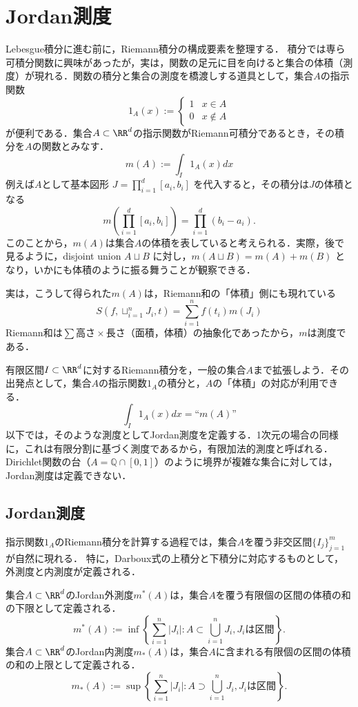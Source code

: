 \setcounter{chapter}{1}
\chapter{Jordan測度}

Lebesgue積分に進む前に，Riemann積分の構成要素を整理する．
積分では専ら可積分関数に興味があったが，実は，関数の足元に目を向けると集合の体積（測度）が現れる．関数の積分と集合の測度を橋渡しする道具として，集合$A$の指示関数
\[
1_A(x) := \begin{cases}
    1 & x \in A \\
    0 & x \notin A
\end{cases}
\]
が便利である．集合$A \subset \RR^d$の指示関数がRiemann可積分であるとき，その積分を$A$の関数とみなす．
\[
m(A) := \int_I 1_A(x) dx
\]
例えば$A$として基本図形 $J = \prod_{i=1}^d [a_i,b_i]$ を代入すると，その積分は$J$の体積となる
\[
m\left( \prod_{i=1}^d [a_i,b_i] \right) = \prod_{i=1}^d (b_i - a_i).
\]
このことから，$m(A)$は集合$A$の体積を表していると考えられる．実際，後で見るように，disjoint union $A \sqcup B$ に対し，$m( A \sqcup B ) = m(A) +m(B)$ となり，いかにも体積のように振る舞うことが観察できる．

実は，こうして得られた$m(A)$は，Riemann和の「体積」側にも現れている
\[
S\left(f,\sqcup_{i=1}^n J_i,t\right) = \sum_{i=1}^n f(t_i) m(J_i)
\]
Riemann和は$\sum \text{高さ} \times \text{長さ（面積，体積）}$の抽象化であったから，$m$は測度である．

有限区間$I \subset \RR^d$に対するRiemann積分を，一般の集合$A$まで拡張しよう．その出発点として，集合$A$の指示関数$1_A$の積分と，$A$の「体積」の対応が利用できる．
\[
\int_I 1_A(x) dx = \text{``}m(A)\text{''}
\]
以下では，そのような測度としてJordan測度を定義する．1次元の場合の同様に，これは有限分割に基づく測度であるから，有限加法的測度と呼ばれる．Dirichlet関数の台（$A = \mathbb{Q} \cap [0,1]$）のように境界が複雑な集合に対しては，Jordan測度は定義できない．

\section{Jordan測度}%

指示関数$1_A$のRiemann積分を計算する過程では，集合$A$を覆う非交区間$\{I_j\}_{j=1}^m$が自然に現れる．
特に，Darboux式の上積分と下積分に対応するものとして，外測度と内測度が定義される．

\begin{definition}[Jordanの外測度と内測度]
    集合$A \subset \RR^d$のJordan外測度$m^*(A)$は，集合$A$を覆う有限個の区間の体積の和の下限として定義される．
    \[
    m^*(A) := \inf \left\{ \sum_{i=1}^n |J_i| : A \subset \bigcup_{i=1}^n J_i, J_i \text{は区間} \right\}.
    \]
    集合$A \subset \RR^d$のJordan内測度$m_*(A)$は，集合$A$に含まれる有限個の区間の体積の和の上限として定義される．
    \[
    m_*(A) := \sup \left\{ \sum_{i=1}^n |J_i| : A \supset \bigcup_{i=1}^n J_i, J_i \text{は区間} \right\}.
    \]    
\end{definition}

